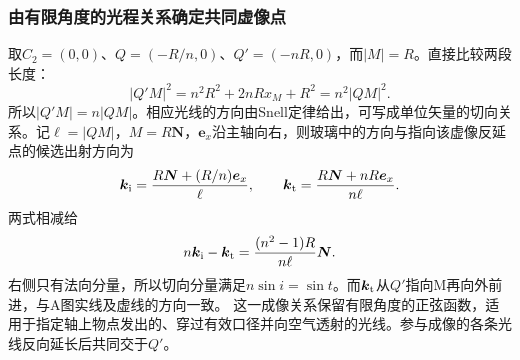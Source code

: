 \documentclass[UTF8,fontset=fandol,a4paper,11pt]{ctexart}
\begin{document}
\subsubsection*{由有限角度的光程关系确定共同虚像点}
取$C_2=(0,0)$、$Q=(-R/n,0)$、$Q'=(-nR,0)$，而$|M|=R$。直接比较两段长度：
\[
|Q'M|^2=n^2R^2+2nR x_M+R^2
=n^2|QM|^2.
\]
所以$|Q'M|=n|QM|$。相应光线的方向由Snell定律给出，可写成单位矢量的切向关系。记$\ell=|QM|$，$M=R\boldsymbol N$，$\boldsymbol e_x$沿主轴向右，则玻璃中的方向与指向该虚像反延点的候选出射方向为
\[
\boldsymbol k_{\rm i}
=\frac{R\boldsymbol N+(R/n)\boldsymbol e_x}{\ell},
\qquad
\boldsymbol k_{\rm t}
=\frac{R\boldsymbol N+nR\boldsymbol e_x}{n\ell}.
\]
两式相减给
\[
n\boldsymbol k_{\rm i}-\boldsymbol k_{\rm t}
=\frac{(n^2-1)R}{n\ell}\boldsymbol N.
\]
右侧只有法向分量，所以切向分量满足$n\sin i=\sin t$。而$\boldsymbol k_{\rm t}$从$Q'$指向M再向外前进，与A图实线及虚线的方向一致。
这一成像关系保留有限角度的正弦函数，适用于指定轴上物点发出的、穿过有效口径并向空气透射的光线。参与成像的各条光线反向延长后共同交于$Q'$。
\end{document}
